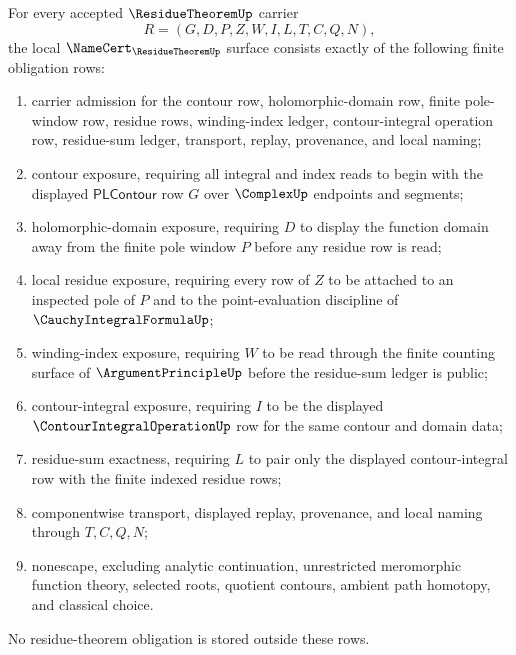 \begin{theorem}
\label{thm:residue-theorem-namecert-obligations}
For every accepted $\ResidueTheoremUp$ carrier
$$
R=(G,D,P,Z,W,I,L,T,C,Q,N),
$$
the local $\NameCert_{\ResidueTheoremUp}$ surface consists exactly of the following finite obligation rows:
\begin{enumerate}
\item carrier admission for the contour row, holomorphic-domain row, finite pole-window row, residue rows, winding-index ledger, contour-integral operation row, residue-sum ledger, transport, replay, provenance, and local naming;
\item contour exposure, requiring all integral and index reads to begin with the displayed $\mathsf{PLContour}$ row $G$ over $\ComplexUp$ endpoints and segments;
\item holomorphic-domain exposure, requiring $D$ to display the function domain away from the finite pole window $P$ before any residue row is read;
\item local residue exposure, requiring every row of $Z$ to be attached to an inspected pole of $P$ and to the point-evaluation discipline of $\CauchyIntegralFormulaUp$;
\item winding-index exposure, requiring $W$ to be read through the finite counting surface of $\ArgumentPrincipleUp$ before the residue-sum ledger is public;
\item contour-integral exposure, requiring $I$ to be the displayed $\ContourIntegralOperationUp$ row for the same contour and domain data;
\item residue-sum exactness, requiring $L$ to pair only the displayed contour-integral row with the finite indexed residue rows;
\item componentwise transport, displayed replay, provenance, and local naming through $T,C,Q,N$;
\item nonescape, excluding analytic continuation, unrestricted meromorphic function theory, selected roots, quotient contours, ambient path homotopy, and classical choice.
\end{enumerate}
No residue-theorem obligation is stored outside these rows.
\end{theorem}
